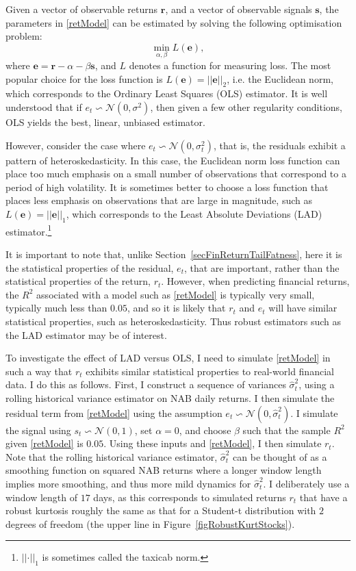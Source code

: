 \documentclass[12pt,a4paper]{amsart}
\renewcommand{\a}{\alpha}
\renewcommand{\b}{\beta}
\newcommand{\s}{\sigma}
\newcommand{\bm}{\mathbf}								%
\newcommand{\N}{\mathcal{N}}							%
\newcommand{\norm}[1]{\left|\left| #1 \right|\right|}		%
\begin{document}
Given a vector of observable returns $\bm{r}$, and a vector of observable signals $\bm{s}$, the parameters in \eqref{retModel} can be estimated by solving the following optimisation problem:
\begin{equation}
\min_{\a, \b} L(\bm{e}) ,
\end{equation}
where $\bm{e} = \bm{r} - \a - \b \bm{s}$, and $L$ denotes a function for measuring loss. The most popular choice for the loss function is $L(\bm{e}) = \norm{\bm{e}}_2$, i.e. the Euclidean norm, which corresponds to the Ordinary Least Squares (OLS) estimator. It is well understood that if $e_t \backsim \N(0, \s^2)$, then given a few other regularity conditions, OLS yields the best, linear, unbiased estimator.

However, consider the case where $e_t \backsim \N(0, \s_t^2)$, that is, the residuals exhibit a pattern of heteroskedasticity. In this case, the Euclidean norm loss function can place too much emphasis on a small number of observations that correspond to a period of high volatility. It is sometimes better to choose a loss function that places less emphasis on observations that are large in magnitude, such as $L(\bm{e}) = \norm{\bm{e}}_1$, which corresponds to the Least Absolute Deviations (LAD) estimator.\footnote{$\norm{\cdot}_1$ is sometimes called the taxicab norm.}

It is important to note that, unlike Section~\ref{secFinReturnTailFatness}, here it is the statistical properties of the residual, $e_t$, that are important, rather than the statistical properties of the return, $r_t$. However, when predicting financial returns, the $R^2$ associated with a model such as \eqref{retModel} is typically very small, typically much less than $0.05$, and so it is likely that $r_t$ and $e_t$ will have similar statistical properties, such as heteroskedasticity. Thus robust estimators such as the LAD estimator may be of interest.

To investigate the effect of LAD versus OLS, I need to simulate \eqref{retModel} in such a way that $r_t$ exhibits similar statistical properties to real-world financial data. I do this as follows. First, I construct a sequence of variances $\hat{\s}_t^2$, using a rolling historical variance estimator on NAB daily returns. I then simulate the residual term from \eqref{retModel} using the assumption $e_t \backsim \N(0, \hat{\s}_t^2)$. I simulate the signal using $s_t \backsim \N(0, 1)$, set $\a = 0$, and choose $\b$ such that the sample $R^2$ given \eqref{retModel} is $0.05$. Using these inputs and \eqref{retModel}, I then simulate $r_t$. Note that the rolling historical variance estimator, $\hat{\s}_t^2$ can be thought of as a smoothing function on squared NAB returns where a longer window length implies more smoothing, and thus more mild dynamics for $\hat{\s}_t^2$. I deliberately use a window length of $17$ days, as this corresponds to simulated returns $r_t$ that have a robust kurtosis roughly the same as that for a Student-t distribution with $2$ degrees of freedom (the upper line in Figure~\ref{figRobustKurtStocks}).
\end{document}
